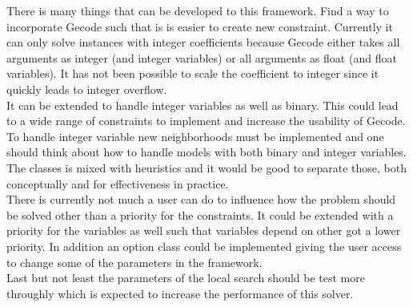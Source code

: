 There is many things that can be developed to this framework. Find a way to incorporate Gecode such that is is 
easier to create new constraint. Currently it can only solve instances with integer coefficients because Gecode either 
takes all arguments as integer (and integer variables) or all arguments as float (and float variables). It has not been 
possible to scale the coefficient to integer since it quickly leads to integer overflow. \\ 
It can be extended to handle integer variables as well as binary. This could lead to a wide range of constraints to 
implement and increase the usability of Gecode. To handle integer variable new neighborhoods must be implemented and 
one should think about how to handle models with both binary and integer variables. \\
The  classes is mixed with heuristics and it would be good to separate those, both conceptually and 
for effectiveness in practice. \\
There is currently not much a user can do to influence how the problem should be solved other than a priority for the 
constraints. It could be extended with a priority for the variables as well such that variables depend on other got a 
lower priority. In addition an option class could be implemented giving the user access to change some of the 
parameters in the framework. \\ 
Last but not least the parameters of the local search should be test more throughly which is expected to increase the 
performance of this solver.  
